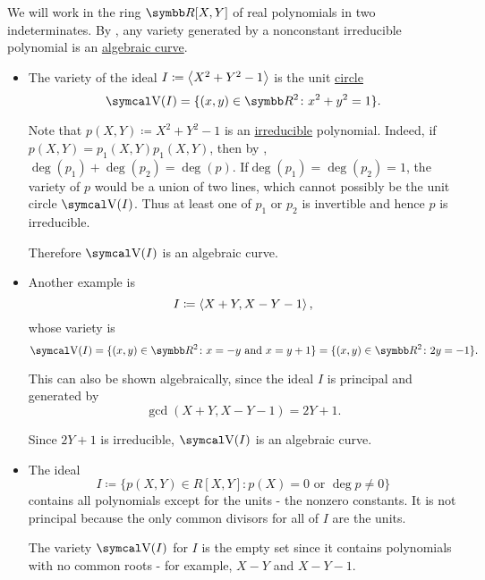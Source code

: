 \begin{example}\label{ex:affine_varieties}
  We will work in the ring \( \BR[X, Y] \) of real polynomials in two indeterminates. By , any variety generated by a nonconstant irreducible polynomial is an \hyperref[def:affine_variety/algebraic_curve]{algebraic curve}.

  \begin{itemize}
    \item The variety of the ideal \( I \coloneqq \Braket{X^2 + Y^2 - 1} \) is the unit \hyperref[def:quadratic_plane_curve/ellipse]{circle}
          \begin{equation*}
            \CV(I) = \{ (x, y) \in \BR^2 \colon x^2 + y^2 = 1 \}.
          \end{equation*}

          Note that \( p(X, Y) \coloneqq X^2 + Y^2 - 1 \) is an \hyperref[def:irreducible_ring_element]{irreducible} polynomial. Indeed, if \( p(X, Y) = p_1(X, Y) p_1(X, Y) \), then by , \( \deg(p_1) + \deg(p_2) = \deg(p) \). If\LEM \( \deg(p_1) = \deg(p_2) = 1 \), the variety of \( p \) would be a union of two lines, which cannot possibly be the unit circle \( \CV(I) \). Thus at least one of \( p_1 \) or \( p_2 \) is invertible and hence \( p \) is irreducible.

          Therefore \( \CV(I) \) is an algebraic curve.

    \item Another example is
          \begin{equation*}
            I \coloneqq \Braket{X + Y, X - Y - 1},
          \end{equation*}
          whose variety is
          \begin{equation*}
            \CV(I) = \{ (x, y) \in \BR^2 \colon x = -y \text{ and } x = y + 1 \} = \{ (x, y) \in \BR^2 \colon 2y = -1 \}.
          \end{equation*}

          This can also be shown algebraically, since the ideal \( I \) is principal and generated by
          \begin{equation*}
            \gcd(X + Y, X - Y - 1) = 2Y + 1.
          \end{equation*}

          Since \( 2Y + 1 \) is irreducible, \( \CV(I) \) is an algebraic curve.

    \item The ideal
          \begin{equation*}
            I \coloneqq \{ p(X, Y) \in R[X, Y] \colon p(X) = 0 \text{ or } \deg p \neq 0 \}
          \end{equation*}
          contains all polynomials except for the units - the nonzero constants. It is not principal because the only common divisors for all of \( I \) are the units.

          The variety \( \CV(I) \) for \( I \) is the empty set since it contains polynomials with no common roots - for example, \( X - Y \) and \( X - Y - 1 \).
  \end{itemize}
\end{example}

